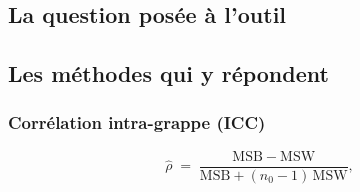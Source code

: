 \subsection{La question posée à l'outil}

\subsection{Les méthodes qui y répondent}

\subsubsection*{Corrélation intra-grappe (ICC)}
\[
  \hat\rho \;=\; \frac{\mathrm{MSB}-\mathrm{MSW}}
                      {\mathrm{MSB} + (n_0 - 1)\,\mathrm{MSW}},
\]

